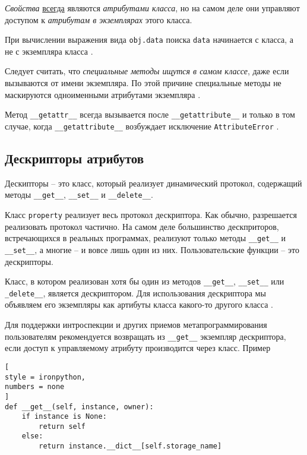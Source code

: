 \documentclass[%
	11pt,
	a4paper,
	utf8,
		]{article}
\begin{document}
\emph{Свойства} \underline{всегда} являются \emph{атрибутами класса}, но на самом деле они управляют доступом к \emph{атрибутам в экземплярах} этого класса.

При вычислении выражения вида \verb*|obj.data| поиска \verb|data| начинается с класса, а не с экземпляра класса \cite[]{ramalho:python-2022}.

Следует считать, что \emph{специальные методы ищутся в самом классе}, даже если вызываются от имени экземпляра. По этой причине специальные методы не маскируются одноименными атрибутами экземпляра \cite[]{ramalho:python-2022}.

Метод \verb*|__getattr__| всегда вызывается после \verb|__getattribute__| и только в том случае, когда \verb*|__getattribute__| возбуждает исключение \verb|AttributeError| \cite[]{ramalho:python-2022}.

\subsection{Дескрипторы атрибутов}

Дескипторы -- это класс, который реализует динамический протокол, содержащий методы \verb*|__get__|, \verb|__set__| и \verb*|__delete__|. 

Класс \verb|property| реализует весь протокол дескриптора. Как обычно, разрешается реализовать протокол частично. На самом деле большинство дескприторов, встречающихся в реальных программах, реализуют только методы \verb*|__get__| и \verb*|__set__|, а многие -- и вовсе лишь один из них. Пользовательские функции -- это дескрипторы.

Класс, в котором реализован хотя бы один из методов \verb|__get__|, \verb*|__set__| или \verb|_delete__|, является дескриптором. Для использования дескриптора мы объявляем его экземпляры как артибуты класса какого-то другого класса \cite[]{ramalho:python-2022}.

Для поддержки интроспекции и других приемов метапрограммирования пользователям рекомендуется возвращать из \verb|__get__| экземпляр дескриптора, если доступ к управляемому атрибуту производится через класс. Пример \cite[]{ramalho:python-2022}
\begin{lstlisting}[
style = ironpython,
numbers = none
]
def __get__(self, instance, owner):
    if instance is None:
        return self
    else:
        return instance.__dict__[self.storage_name]
\end{lstlisting}
\end{document}
